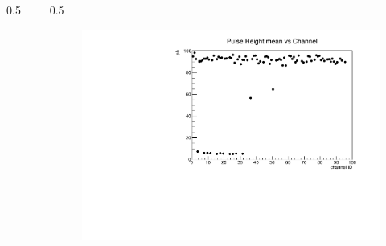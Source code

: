 \documentclass{beamer}
\begin{document}
\begin{frame}
\begin{columns}
\begin{column}{0.5\framewidth}
\begin{figure}[!h]
         \label{fig:normalhits}
    \end{figure}
    \end{column}
    \begin{column}{0.5\framewidth}
             \begin{figure}[!h]
          \centering
          \hspace*{-1em}
          \includegraphics[width=1.\columnwidth]{figures/pdf/ph_vs_ch1.pdf}
         \label{fig:normalhits}
    \end{figure}
    \end{column}
    \end{columns}
    \end{frame}
    
\end{document}
